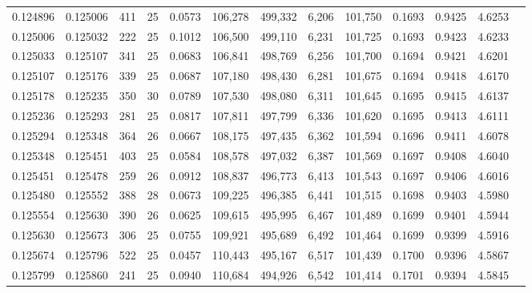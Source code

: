 \begin{tabular}{rrrrrrrrrrrrr}
0.124896 & 0.125006 & 411 &  25 &                                     0.0573 & 106,278 & 499,332 &   6,206 & 101,750 & 0.1693 & 0.9425 & 4.6253 \\
0.125006 & 0.125032 & 222 &  25 &                                     0.1012 & 106,500 & 499,110 &   6,231 & 101,725 & 0.1693 & 0.9423 & 4.6233 \\
0.125033 & 0.125107 & 341 &  25 &                                     0.0683 & 106,841 & 498,769 &   6,256 & 101,700 & 0.1694 & 0.9421 & 4.6201 \\
0.125107 & 0.125176 & 339 &  25 &                                     0.0687 & 107,180 & 498,430 &   6,281 & 101,675 & 0.1694 & 0.9418 & 4.6170 \\
0.125178 & 0.125235 & 350 &  30 &                                     0.0789 & 107,530 & 498,080 &   6,311 & 101,645 & 0.1695 & 0.9415 & 4.6137 \\
0.125236 & 0.125293 & 281 &  25 &                                     0.0817 & 107,811 & 497,799 &   6,336 & 101,620 & 0.1695 & 0.9413 & 4.6111 \\
0.125294 & 0.125348 & 364 &  26 &                                     0.0667 & 108,175 & 497,435 &   6,362 & 101,594 & 0.1696 & 0.9411 & 4.6078 \\
0.125348 & 0.125451 & 403 &  25 &                                     0.0584 & 108,578 & 497,032 &   6,387 & 101,569 & 0.1697 & 0.9408 & 4.6040 \\
0.125451 & 0.125478 & 259 &  26 &                                     0.0912 & 108,837 & 496,773 &   6,413 & 101,543 & 0.1697 & 0.9406 & 4.6016 \\
0.125480 & 0.125552 & 388 &  28 &                                     0.0673 & 109,225 & 496,385 &   6,441 & 101,515 & 0.1698 & 0.9403 & 4.5980 \\
0.125554 & 0.125630 & 390 &  26 &                                     0.0625 & 109,615 & 495,995 &   6,467 & 101,489 & 0.1699 & 0.9401 & 4.5944 \\
0.125630 & 0.125673 & 306 &  25 &                                     0.0755 & 109,921 & 495,689 &   6,492 & 101,464 & 0.1699 & 0.9399 & 4.5916 \\
0.125674 & 0.125796 & 522 &  25 &                                     0.0457 & 110,443 & 495,167 &   6,517 & 101,439 & 0.1700 & 0.9396 & 4.5867 \\
0.125799 & 0.125860 & 241 &  25 &                                     0.0940 & 110,684 & 494,926 &   6,542 & 101,414 & 0.1701 & 0.9394 & 4.5845 \\

\end{tabular}
